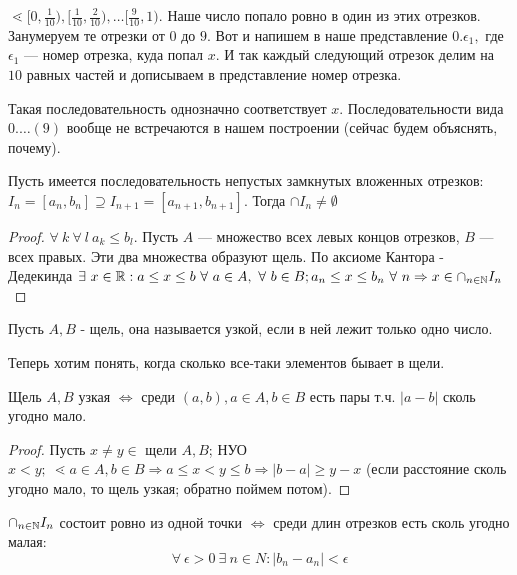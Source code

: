 \documentclass[12pt]{report}
\begin{document}
$\lessdot [0, \frac{1}{10}), [\frac{1}{10}, \frac{2}{10}), \dots [\frac{9}{10}, 1).$ Наше число попало ровно в один из этих отрезков. Занумеруем те отрезки от $0$ до $9$. Вот и напишем в наше представление $0.\epsilon_1,$ где $\epsilon_1$ --- номер отрезка, куда попал $x$. И так каждый следующий отрезок делим на $10$ равных частей и дописываем в представление номер отрезка.

Такая последовательность однозначно соответствует $x$. Последовательности вида $0. \dots (9)$ вообще не встречаются в нашем построении (сейчас будем объяснять, почему). 

\begin{lm}
Пусть имеется последовательность непустых замкнутых вложенных отрезков: $I_n = [a_n, b_n] \supseteq I_{n + 1} = [a_{n + 1}, b_{n + 1}]$. Тогда $\cap I_n \neq \emptyset$
\end{lm}
\begin{proof}
$\forall ~k ~\forall ~l ~a_k \le b_l$. Пусть $A$ --- множество всех левых концов отрезков, $B$ --- всех правых. Эти два множества образуют щель. По аксиоме Кантора - Дедекинда $\exists ~x \in \mathbb{R}: a \le x \le b ~\forall ~a \in A, ~\forall ~b \in B; a_n \le x \le b_n ~\forall ~n \Rightarrow x \in \cap_{n \in \mathbb{N}}I_n$
\end{proof}

\begin{defn}
Пусть $A, B$ - щель, она называется узкой, если в ней лежит только одно число.
\end{defn}

Теперь хотим понять, когда сколько все-таки элементов бывает в щели.

\begin{lm}
Щель $A, B$ узкая $\Leftrightarrow$ среди $(a, b), a \in A, b \in B$ есть пары т.ч. $|a - b|$ сколь угодно мало.
\end{lm}
\begin{proof}
Пусть $x \neq y \in$ щели $A, B$; НУО $x < y; ~\lessdot a \in A, b \in B \Rightarrow a \le x < y \le b \Rightarrow |b - a| \ge y - x$ (если расстояние сколь угодно мало, то щель узкая; обратно поймем потом).
\end{proof}

\begin{cor}$\cap_{n \in \mathbb{N}}I_n$ состоит ровно из одной точки $\Leftrightarrow$ среди длин отрезков есть сколь угодно малая:
$$\forall ~\epsilon > 0 ~\exists ~n \in N: |b_n - a_n| < \epsilon$$
\end{cor}
\end{document}
